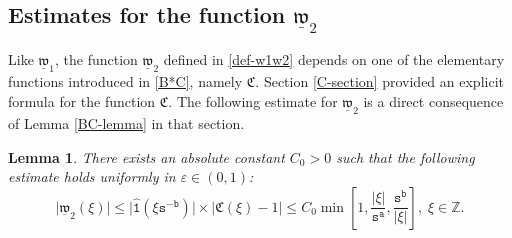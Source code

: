 \documentclass[12pt, twoside]{article}
\def\red{\color{red}}
\newtheorem{lemma}[theorem]{Lemma}
\theoremstyle{definition}
\numberwithin{equation}{section}
\begin{document}
\subsection{Estimates for the function $\underline{\mathfrak w}_2$} \label{w2-section}
Like $\underline{\mathfrak w}_1$, the function $\underline{\mathfrak w}_2$ defined in \eqref{def-w1w2} depends on one of the elementary functions introduced in \eqref{B*C}, namely $\mathfrak C$. Section \ref{C-section} provided an explicit formula for the function $\mathfrak C$. The following estimate for $\underline{\mathfrak w}_2$ is a direct consequence of Lemma \ref{BC-lemma} in that section. 
\begin{lemma} \label{1-hat-C-corollary}
There exists an absolute constant $C_0 > 0$ such that 
the following estimate holds uniformly in $\varepsilon\in (0,1)$:
\begin{equation} \label{1-hat-C} 
\bigl| \underline{\mathfrak w}_2(\xi) \bigr| \leq \bigl|\widehat{\mathtt 1}(\xi \mathtt s^{-\mathtt b}) \bigr| \times \bigl|\mathfrak C(\xi) - 1\bigr| \leq C_0 \min \left[1, \frac{|\xi|}{\mathtt s^{\mathtt a}}, \frac{\mathtt s^{\mathtt b}}{|\xi|} \right],\; \xi \in \mathbb{Z}.
\end{equation} 
\end{lemma} 
\end{document}
